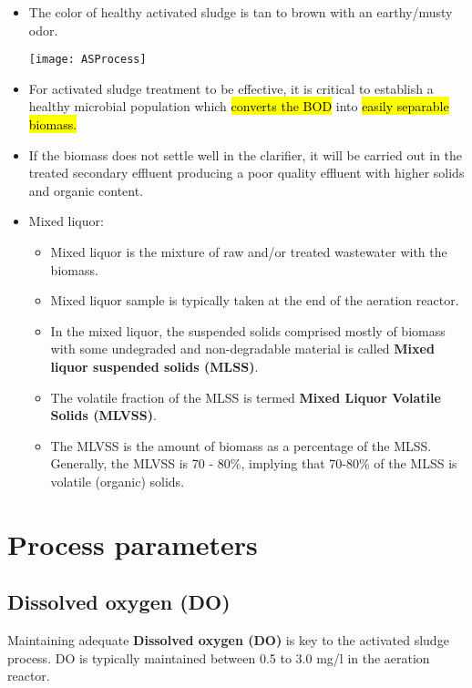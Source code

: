 \begin{itemize}
\item The color of healthy activated sludge is tan to brown with an earthy/musty odor.
\newpage
\begin{center}
\texttt{[image: ASProcess]}
\end{center}

\item For activated sludge treatment to be effective, it is critical to establish a healthy microbial population which \hl{converts the BOD} into \hl{easily separable biomass.}
\item If the biomass does not settle well in the clarifier, it will be carried out in the treated secondary effluent producing a poor quality effluent with higher solids and organic content.  \\

\item Mixed liquor:
\begin{itemize}
\item Mixed liquor is the mixture of raw and/or treated wastewater with the biomass.
\item Mixed liquor sample is typically taken at the end of the aeration reactor.
\item In the mixed liquor, the suspended solids comprised mostly of biomass with some undegraded and non-degradable material is called \textbf{Mixed liquor suspended solids (MLSS)}.  
\item The volatile fraction of the MLSS is termed \textbf{Mixed Liquor Volatile Solids (MLVSS)}.  \item The MLVSS is the amount of biomass as a percentage of the MLSS.  Generally, the MLVSS is 70 - 80\%, implying that 70-80\% of the MLSS is volatile (organic) solids.
\end{itemize}

\end{itemize}

		\section{Process parameters}
\subsection{Dissolved oxygen (DO)}%
Maintaining adequate \textbf{Dissolved oxygen (DO)} is key to the activated sludge process.  DO is typically maintained between 0.5 to 3.0 mg/l in the aeration reactor.\\
